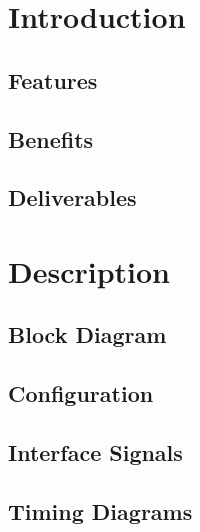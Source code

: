\documentclass{\TEX/ug/ug}
\begin{document}
\maketitle
\cleardoublepage
\tableofcontents
\listoftables
\listoffigures
\cleardoublepage

\section{Introduction}
\label{sec:intro}



\subsection{Features}
\label{sec:feat}


\subsection{Benefits}
\label{sec:benef}


\subsection{Deliverables}
\label{sec:deliv}


\section{Description}
\subsection{Block Diagram}
\label{sec:bdd}


\subsection{Configuration}
\label{sec:ipconfig}


\subsection{Interface Signals}
\label{sec:ifsig}

\ifdefined\TD
\subsection{Timing Diagrams}
\label{sec:td}

\fi
\end{document}
